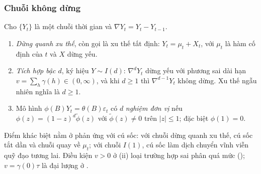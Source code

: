 \subsubsection{Chuỗi không dừng}

\begin{kq}
Cho $\{Y_t\}$ là một chuỗi thời gian và $\nabla Y_t=Y_t-Y_{t-1}$.
\begin{enumerate}[label=(\roman*),leftmargin=*,itemsep=1pt]
\item \emph{Dừng quanh xu thế}, còn gọi là xu thế tất định: $Y_t=\mu_t+X_t$, với $\mu_t$ là hàm cố định của $t$ và $X$ dừng yếu.
\item \emph{Tích hợp bậc $d$}, ký hiệu $Y\sim I(d)$: $\nabla^dY_t$ dừng yếu với phương sai dài hạn $v=\sum_h\gamma(h)\in(0,\infty)$, và khi $d\ge1$ thì $\nabla^{d-1}Y_t$ không dừng. Xu thế ngẫu nhiên nghĩa là $d\ge1$.
\item Mô hình $\phi(B)Y_t=\theta(B)\varepsilon_t$ có $d$ \emph{nghiệm đơn vị} nếu $\phi(z)=(1-z)^d\tilde\phi(z)$ với $\tilde\phi(z)\ne0$ trên $|z|\le1$; đặc biệt $\phi(1)=0$.
\end{enumerate}
\end{kq}
Điểm khác biệt nằm ở phản ứng với cú sốc: với chuỗi dừng quanh xu thế, cú sốc tắt dần và chuỗi quay về $\mu_t$; với chuỗi $I(1)$, cú sốc làm dịch chuyển vĩnh viễn quỹ đạo tương lai. Điều kiện $v>0$ ở (ii) loại trường hợp sai phân quá mức (); $v=\gamma(0)\tau$ là đại lượng ở .


